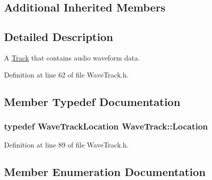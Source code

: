 \subsection*{Additional Inherited Members}


\subsection{Detailed Description}
A \hyperlink{class_track}{Track} that contains audio waveform data. 

Definition at line 62 of file Wave\+Track.\+h.



\subsection{Member Typedef Documentation}
\subsubsection[{\texorpdfstring{Location}{Location}}]{\setlength{\rightskip}{0pt plus 5cm}typedef {\bf Wave\+Track\+Location} {\bf Wave\+Track\+::\+Location}}\hypertarget{class_wave_track_a7982000384163865535670612b611529}{}\label{class_wave_track_a7982000384163865535670612b611529}


Definition at line 89 of file Wave\+Track.\+h.



\subsection{Member Enumeration Documentation}
